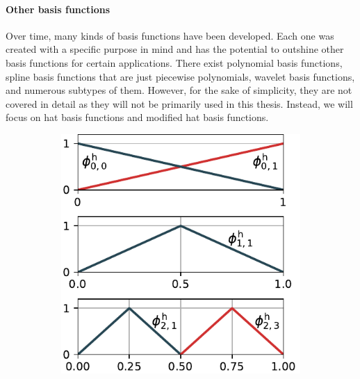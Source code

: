 \documentclass[
  a4paper,  %
  twoside,  %
  bibliography=totoc,
  headsepline,
  cleardoublepage=empty,
  parskip=half,
  draft=false
]{scrbook}
\begin{document}
\paragraph{Other basis functions}
Over time, many kinds of basis functions have been developed.
Each one was created with a specific purpose in mind and has the potential to outshine other basis functions for certain applications.
There exist polynomial basis functions, spline basis functions that are just piecewise polynomials, wavelet basis functions, and numerous subtypes of them.
However, for the sake of simplicity, they are not covered in detail as they will not be primarily used in this thesis.
Instead, we will focus on hat basis functions and modified hat basis functions.

\begin{mdframed}[style=style]
\begin{figure}[H]
\begin{subfigure}{.5\textwidth}
  \includegraphics[width=\linewidth]{graphics/basis_hat}
  \label{fig:basis_hat_normal}
\vspace{1.5mm}
\end{subfigure}%
\begin{subfigure}{.5\textwidth}

\end{subfigure}
\end{figure}
\end{mdframed}
\end{document}
